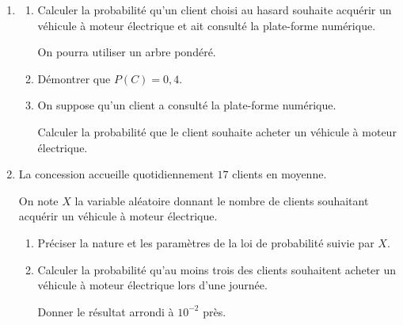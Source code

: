 \documentclass[10pt]{article}
\begin{document}
\begin{enumerate}
\item 
	\begin{enumerate}
		\item Calculer la probabilité qu'un client choisi au hasard souhaite acquérir un véhicule à moteur électrique et ait consulté la plate-forme numérique.
		
On pourra utiliser un arbre pondéré.
		\item Démontrer que $P(C) = 0,4$.
		\item On suppose qu'un client a consulté la plate-forme numérique.
		
Calculer la probabilité que le client souhaite acheter un véhicule à moteur
électrique.
	\end{enumerate}
\item La concession accueille quotidiennement $17$ clients en moyenne.

On note $X$ la variable aléatoire donnant le nombre de clients souhaitant acquérir un véhicule à moteur électrique.
	\begin{enumerate}
		\item Préciser la nature et les paramètres de la loi de probabilité suivie par $X$.
		\item Calculer la probabilité qu'au moins trois des clients souhaitent acheter un véhicule à moteur électrique lors d'une journée.
		
Donner le résultat arrondi à $10^{-2}$ près.
	\end{enumerate}
\end{enumerate}
\end{document}
